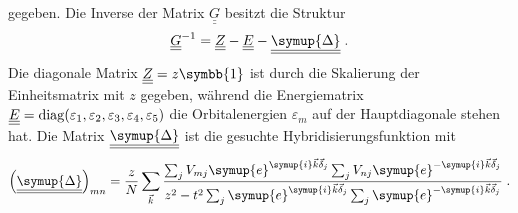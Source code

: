 gegeben.
Die Inverse der Matrix  $\underline{\underline{G}}$ besitzt die Struktur 
\begin{equation}
    \underline{\underline{G}}^{-1} = \underline{\underline{Z}} - \underline{\underline{E}} - \underline{\underline{\symup{\Delta}}} \; .
\end{equation}
Die diagonale Matrix $\underline{\underline{Z}} = z\symbb{1}$ ist durch die Skalierung der Einheitsmatrix mit $z$ gegeben, während die Energiematrix 
$\underline{\underline{E}} = \operatorname{diag}(\varepsilon_1, \varepsilon_2, \varepsilon_3, \varepsilon_4, \varepsilon_5)$
die Orbitalenergien $\varepsilon_m$ auf der Hauptdiagonale stehen hat.
Die Matrix $\underline{\underline{\symup{\Delta}}}$ ist die gesuchte Hybridisierungsfunktion mit 
\begin{equation*}
    \left ( \underline{\underline{\symup{\Delta}}} \right )_{mn} =  \frac{z}{N}\sum_{\vec{k}}
    \frac{\sum_j V_{mj}\symup{e}^{\symup{i}\vec{k}\vec{\delta}_j}\sum_j V_{nj}\symup{e}^{-\symup{i}\vec{k}\vec{\delta}_j}}
    {z^2-t^2\sum_j \symup{e}^{\symup{i}\vec{k}\vec{\delta}_j} \sum_j \symup{e}^{-\symup{i}\vec{k}\vec{\delta}_j}} \; .
\end{equation*}
